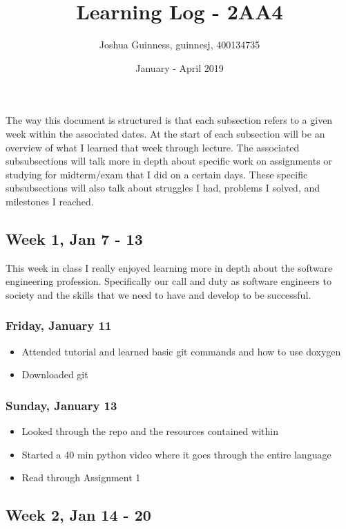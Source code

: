 \documentclass{article}
\title{Learning Log - 2AA4}
\author{Joshua Guinness, guinnesj, 400134735}
\date{January - April 2019}
\begin{document}
\maketitle

The way this document is structured is that each subsection refers to a given week within the associated dates. At the start of each subsection will be an overview of what I learned that week through lecture. The associated subsubsections will talk more in depth about specific work on assignments or studying for midterm/exam that I did on a certain days. These specific subsubsections will also talk about struggles I had, problems I solved, and milestones I reached.

\subsection{Week 1, Jan 7 - 13}

This week in class I really enjoyed learning more in depth about the software engineering profession. Specifically our call and duty as software engineers to society and the skills that we need to have and develop to be successful. 

\subsubsection{Friday, January 11}
\begin{itemize}
    \item Attended tutorial and learned basic git commands and how to use doxygen
    \item Downloaded git
\end{itemize}

\subsubsection{Sunday, January 13}
\begin{itemize}
    \item Looked through the repo and the resources contained within
    \item Started a 40 min python video where it goes through the entire language
    \item Read through Assignment 1
\end{itemize}

\subsection{Week 2, Jan 14 - 20}
\end{document}

